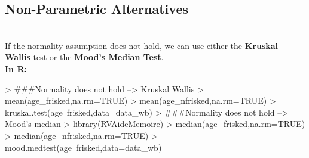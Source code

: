 \documentclass{article}
\begin{document}
\subsection{Non-Parametric Alternatives}
\\ If the normality assumption does not hold, we can use either the \textbf{Kruskal Wallis} test or the \textbf{Mood's Median Test}.
\\ \textbf{In R:}
\begin{Schunk}
\begin{Sinput}
> ###Normality does not hold --> Kruskal Wallis
> mean(age_frisked,na.rm=TRUE)
> mean(age_nfrisked,na.rm=TRUE)
> kruskal.test(age~frisked,data=data_wb)
> ###Normality does not hold --> Mood's median
> library(RVAideMemoire)
> median(age_frisked,na.rm=TRUE)
> median(age_nfrisked,na.rm=TRUE)
> mood.medtest(age~frisked,data=data_wb)
\end{Sinput}
\end{Schunk}
\end{document}
